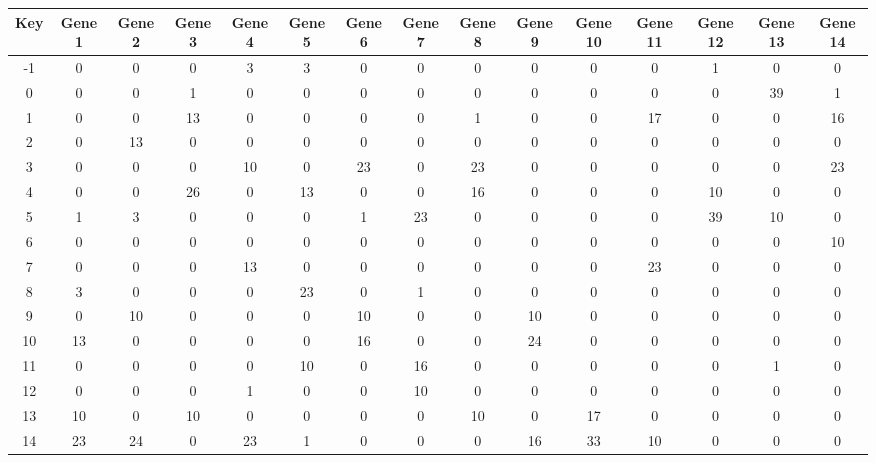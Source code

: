 \begin{tabular}{|c|c|c|c|c|c|c|c|c|c|c|c|c|c|c|}
\hline
Key & Gene 1 & Gene 2 & Gene 3 & Gene 4 & Gene 5 & Gene 6 & Gene 7 & Gene 8 & Gene 9 & Gene 10 & Gene 11 & Gene 12 & Gene 13 & Gene 14 \\
\hline
-1 & 0 & 0 & 0 & 3 & 3 & 0 & 0 & 0 & 0 & 0 & 0 & 1 & 0 & 0 \\
0 & 0 & 0 & 1 & 0 & 0 & 0 & 0 & 0 & 0 & 0 & 0 & 0 & 39 & 1 \\
1 & 0 & 0 & 13 & 0 & 0 & 0 & 0 & 1 & 0 & 0 & 17 & 0 & 0 & 16 \\
2 & 0 & 13 & 0 & 0 & 0 & 0 & 0 & 0 & 0 & 0 & 0 & 0 & 0 & 0 \\
3 & 0 & 0 & 0 & 10 & 0 & 23 & 0 & 23 & 0 & 0 & 0 & 0 & 0 & 23 \\
4 & 0 & 0 & 26 & 0 & 13 & 0 & 0 & 16 & 0 & 0 & 0 & 10 & 0 & 0 \\
5 & 1 & 3 & 0 & 0 & 0 & 1 & 23 & 0 & 0 & 0 & 0 & 39 & 10 & 0 \\
6 & 0 & 0 & 0 & 0 & 0 & 0 & 0 & 0 & 0 & 0 & 0 & 0 & 0 & 10 \\
7 & 0 & 0 & 0 & 13 & 0 & 0 & 0 & 0 & 0 & 0 & 23 & 0 & 0 & 0 \\
8 & 3 & 0 & 0 & 0 & 23 & 0 & 1 & 0 & 0 & 0 & 0 & 0 & 0 & 0 \\
9 & 0 & 10 & 0 & 0 & 0 & 10 & 0 & 0 & 10 & 0 & 0 & 0 & 0 & 0 \\
10 & 13 & 0 & 0 & 0 & 0 & 16 & 0 & 0 & 24 & 0 & 0 & 0 & 0 & 0 \\
11 & 0 & 0 & 0 & 0 & 10 & 0 & 16 & 0 & 0 & 0 & 0 & 0 & 1 & 0 \\
12 & 0 & 0 & 0 & 1 & 0 & 0 & 10 & 0 & 0 & 0 & 0 & 0 & 0 & 0 \\
13 & 10 & 0 & 10 & 0 & 0 & 0 & 0 & 10 & 0 & 17 & 0 & 0 & 0 & 0 \\
14 & 23 & 24 & 0 & 23 & 1 & 0 & 0 & 0 & 16 & 33 & 10 & 0 & 0 & 0 \\
\hline
\end{tabular}
